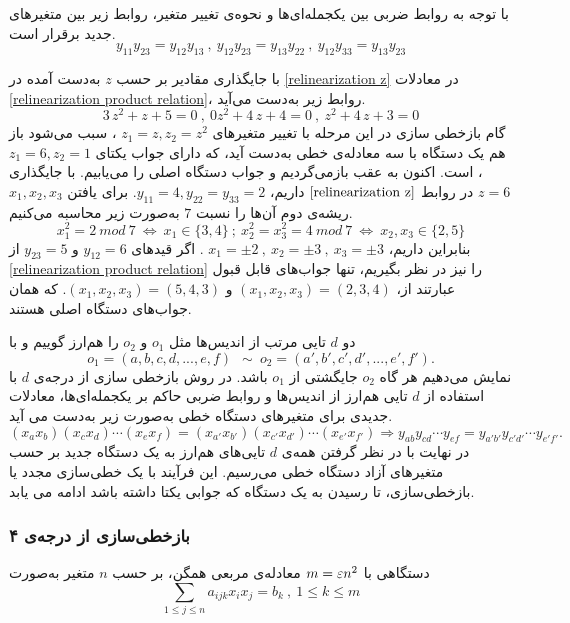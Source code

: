 \begin{example}
با توجه به روابط ضربی بین یکجمله‌ای‌ها و نحوه‌ی تغییر متغیر، روابط زیر بین متغیر‌های جدید برقرار است.
\begin{equation}
\label{relinearization product relation}
y_{11}y_{23} = y_{12}y_{13} \ , \ y_{12}y_{23} = y_{13}y_{22} \ , \ y_{12}y_{33} = y_{13}y_{23}
\end{equation}

با جایگذاری مقادیر بر حسب 
$z$
به‌دست  آمده در 
\ref{relinearization z}
در معادلات 
\ref{relinearization product relation}،
روابط زیر به‌دست  می‌آید. 
$$3\,{z}^{2}+z+5=0 \ , \  0z^{2} + 4\,z+4=0 \ , \ {z}^{2}+4\,z+3=0$$
گام بازخطی سازی در این مرحله با تغییر متغیر‌های
$z_{1} = z, z_{2} = z^{2}$
، سبب می‌شود باز هم یک دستگاه با سه معادله‌ی خطی به‌دست  آید، که دارای جواب یکتای 
$z_{1} = 6, z_{2} = 1$
، است. اکنون به عقب بازمی‌گردیم و جواب دستگاه اصلی را می‌یابیم. با جایگذاری 
$z = 6$
در روابط 
$\ref{relinearization z}$
داریم، 
$y_{11} = 4, y_{22}=y_{33} =2$.
برای یافتن 
$x_{1},x_{2},x_{3}$
ریشه‌ی دوم آن‌ها را نسبت 
$7$
به‌صورت زیر محاسبه‌ می‌کنیم. 
$$x_{1}^{2} = 2 \ mod \ 7  \ \Longleftrightarrow \  x_{1}\in\{3,4\} \ ; \ x_{2}^{2} = x_{3}^{2} = 4 \ mod \ 7 \ \Longleftrightarrow \ x_{2}, x_{3}\in\{2,5\}$$
بنابراین داریم، 
$x_{1} = \pm 2 \ , \ x_{2} = \pm 3 \ , \ x_{3} = \pm 3$
. اگر قیدهای 
$y_{12} = 6$
و
$y_{23} = 5$
از 
\ref{relinearization product relation}
را نیز در نظر بگیریم، تنها جواب‌های قابل قبول عبارتند از، 
$(x_{1},x_{2},x_{3}) = (2,3,4)$
و
$(x_{1},x_{2},x_{3}) = (5,4,3)$.
که همان جواب‌های دستگاه اصلی هستند.
\end{example}

دو 
$d$
تایی‌ مرتب از اندیس‌ها مثل 
$o_{1}$
و
$o_{2}$
را هم‌ارز گوییم و با 
$$o_{1} = (a,b,c,d,...,e,f)\ \ \sim \ o_{2} = (a',b',c',d',...,e',f').$$
نمایش می‌دهیم هر گاه 
$o_{2}$
جایگشتی از
$o_{1}$
باشد. در روش بازخطی سازی از درجه‌ی 
$d$
با استفاده از  
$d$
تایی هم‌ارز از اندیس‌ها و روابط ضربی حاکم بر یکجمله‌ای‌ها، معادلات جدیدی برای متغیرهای دستگاه خطی به‌صورت زیر به‌دست  می آید.
$$(x_{a}x_{b})(x_{c}x_{d})\cdots(x_{e}x_{f}) = (x_{a'}x_{b'})(x_{c'}x_{d'})\cdots(x_{e'}x_{f'}) \Rightarrow y_{ab}y_{cd}\cdots y_{ef} = y_{a'b'}y_{c'd'}\cdots y_{e'f'}.$$
در نهایت با در نظر گرفتن همه‌ی 
$d$
تایی‌های هم‌ارز به یک دستگاه جدید بر حسب متغیرهای آزاد دستگاه خطی می‌رسیم. این فرآیند با یک خطی‌سازی مجدد یا بازخطی‌سازی،  تا رسیدن به یک دستگاه که جوابی یکتا داشته باشد ادامه می یابد.

\subsubsection*{بازخطی‌سازی از درجه‌ی ۴}
دستگاهی با 
$m = \varepsilon n^{2}$
معادله‌ی مربعی همگن، بر حسب 
$n$
متغیر به‌صورت
$$\sum_{1\leq j\leq n}a_{ijk}x_{i}x_{j} = b_{k} \ , \ 1\leq k\leq m$$


